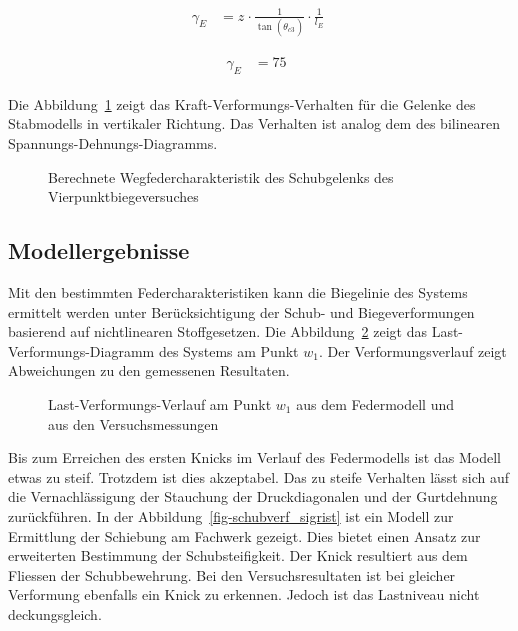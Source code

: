 \documentclass[
  11pt,
  letterpaper,
]{scrreprt}
\begin{document}
$$
\begin{aligned}
\gamma_{E_{_{}}} &= z_{_{}} \cdot \frac{ 1 }{ \tan \left( \theta_{c3_{_{}}} \right) } \cdot \frac{1} { l_{E} } \; 
\end{aligned}
$$

$$
\begin{aligned}
\gamma_{E_{_{}}} &= 75\ \;
\end{aligned}
$$

Die Abbildung~\ref{fig-wegfeder-schub-sv14} zeigt das
Kraft-Verformungs-Verhalten für die Gelenke des Stabmodells in
vertikaler Richtung. Das Verhalten ist analog dem des bilinearen
Spannungs-Dehnungs-Diagramms.

\begin{figure}[H]


\caption{\label{fig-wegfeder-schub-sv14}Berechnete
Wegfedercharakteristik des Schubgelenks des Vierpunktbiegeversuches}

\end{figure}%

\subsection{Modellergebnisse}\label{modellergebnisse-1}

Mit den bestimmten Federcharakteristiken kann die Biegelinie des Systems
ermittelt werden unter Berücksichtigung der Schub- und Biegeverformungen
basierend auf nichtlinearen Stoffgesetzen. Die
Abbildung~\ref{fig-l-w-sv14} zeigt das Last-Verformungs-Diagramm des
Systems am Punkt \(w_1\). Der Verformungsverlauf zeigt Abweichungen zu
den gemessenen Resultaten.

\begin{figure}[H]


\caption{\label{fig-l-w-sv14}Last-Verformungs-Verlauf am Punkt \(w_1\)
aus dem Federmodell und aus den Versuchsmessungen}

\end{figure}%

Bis zum Erreichen des ersten Knicks im Verlauf des Federmodells ist das
Modell etwas zu steif. Trotzdem ist dies akzeptabel. Das zu steife
Verhalten lässt sich auf die Vernachlässigung der Stauchung der
Druckdiagonalen und der Gurtdehnung zurückführen. In der
Abbildung~\ref{fig-schubverf_sigrist} ist ein Modell zur Ermittlung der
Schiebung am Fachwerk gezeigt. Dies bietet einen Ansatz zur erweiterten
Bestimmung der Schubsteifigkeit. Der Knick resultiert aus dem Fliessen
der Schubbewehrung. Bei den Versuchsresultaten ist bei gleicher
Verformung ebenfalls ein Knick zu erkennen. Jedoch ist das Lastniveau
nicht deckungsgleich.
\end{document}
